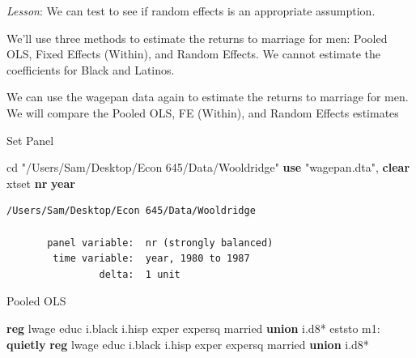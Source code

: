 \documentclass[
]{book}
\newenvironment{Shaded}{\begin{snugshade}}{\end{snugshade}}
\newcommand{\BaseNTok}[1]{\textcolor[rgb]{0.00,0.00,0.81}{#1}}
\newcommand{\FunctionTok}[1]{\textcolor[rgb]{0.13,0.29,0.53}{\textbf{#1}}}
\newcommand{\KeywordTok}[1]{\textcolor[rgb]{0.13,0.29,0.53}{\textbf{#1}}}
\newcommand{\NormalTok}[1]{#1}
\newcommand{\StringTok}[1]{\textcolor[rgb]{0.31,0.60,0.02}{#1}}
\begin{document}
\emph{Lesson}: We can test to see if random effects is an appropriate assumption.

We'll use three methods to estimate the returns to marriage for men: Pooled OLS, Fixed Effects (Within), and Random Effects. We cannot estimate the coefficients for Black and Latinos.

We can use the wagepan data again to estimate the returns to marriage for men. We will compare the Pooled OLS, FE (Within), and Random Effects estimates

Set Panel

\begin{Shaded}
\begin{Highlighting}[]
\NormalTok{cd }\StringTok{"/Users/Sam/Desktop/Econ 645/Data/Wooldridge"}
\KeywordTok{use} \StringTok{"wagepan.dta"}\NormalTok{, }\KeywordTok{clear}
\NormalTok{xtset }\KeywordTok{nr} \FunctionTok{year}
\end{Highlighting}
\end{Shaded}

\begin{verbatim}
/Users/Sam/Desktop/Econ 645/Data/Wooldridge

       panel variable:  nr (strongly balanced)
        time variable:  year, 1980 to 1987
                delta:  1 unit
\end{verbatim}

Pooled OLS

\begin{Shaded}
\begin{Highlighting}[]
\KeywordTok{reg}\NormalTok{ lwage educ i.}\BaseNTok{black}\NormalTok{ i.hisp exper expersq married }\KeywordTok{union}\NormalTok{ i.d8*}
\NormalTok{eststo m1: }\KeywordTok{quietly} \KeywordTok{reg}\NormalTok{ lwage educ i.}\BaseNTok{black}\NormalTok{ i.hisp exper expersq married }\KeywordTok{union}\NormalTok{ i.d8*}
\end{Highlighting}
\end{Shaded}
\end{document}
